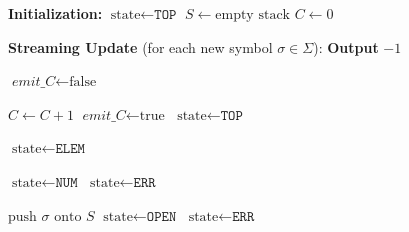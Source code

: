 \documentclass[11pt]{article}
\begin{document}
\begin{algorithm}[H]
\caption{Streaming Message Parser (Part 1)}
\begin{algorithmic}[1]
\State \textbf{Initialization:}
\State $\text{state} \gets \texttt{TOP}$ 
\State $S \gets \text{empty stack}$ 
\State $C \gets 0$ 

\State \textbf{Streaming Update} (for each new symbol $\sigma \in \Sigma$):
    \State \textbf{Output} $-1$
    \State \Return
\EndIf

\State $\textit{emit\_C} \gets \text{false}$ 

    \State $C \gets C + 1$
    \State $\textit{emit\_C} \gets \text{true}$
    \State $\text{state} \gets \texttt{TOP}$
\EndIf

        \State $\text{state} \gets \texttt{ELEM}$
    \EndIf
\EndIf

        \State $\text{state} \gets \texttt{NUM}$
        \State $\text{state} \gets \texttt{ERR}$
    \EndIf
\EndIf

\If{$\sigma \in \{\text{[}, \text{\{}\}$ (open bracket/brace)}
        \State $\text{push } \sigma \text{ onto } S$
        \State $\text{state} \gets \texttt{OPEN}$
    \Else
        \State $\text{state} \gets \texttt{ERR}$
    \EndIf
\EndIf

\end{algorithmic}
\end{algorithm}
\end{document}
